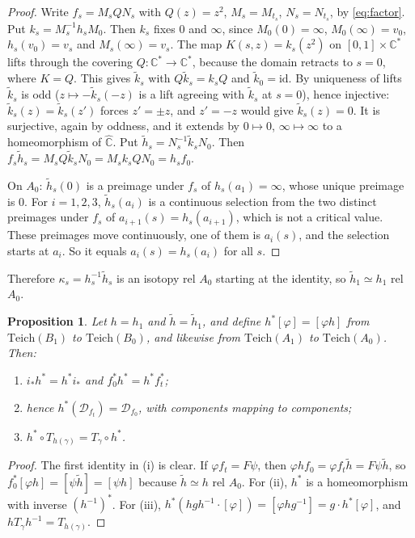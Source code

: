 \documentclass[11pt]{article}
\newtheorem{proposition}{Proposition}[section]
\theoremstyle{definition}
\newcommand{\Teich}{\mathrm{Teich}}
\newcommand{\Ch}{\hat{\mathbb C}}
\newcommand{\D}{\mathcal D}
\begin{document}
\begin{proof}
Write $f_s=M_sQN_s$ with $Q(z)=z^2$, $M_s=M_{t_s}$, $N_s=N_{t_s}$, by \eqref{eq:factor}. Put $k_s=M_s^{-1}h_sM_0$. Then $k_s$ fixes $0$ and $\infty$, since $M_0(0)=\infty$, $M_0(\infty)=v_0$, $h_s(v_0)=v_s$ and $M_s(\infty)=v_s$. The map $K(s,z)=k_s(z^2)$ on $[0,1]\times\mathbb C^*$ lifts through the covering $Q\colon\mathbb C^*\to\mathbb C^*$, because the domain retracts to $s=0$, where $K=Q$. This gives $\tilde k_s$ with $Q\tilde k_s=k_sQ$ and $\tilde k_0=\mathrm{id}$. By uniqueness of lifts $\tilde k_s$ is odd ($z\mapsto-\tilde k_s(-z)$ is a lift agreeing with $\tilde k_s$ at $s=0$), hence injective: $\tilde k_s(z)=\tilde k_s(z')$ forces $z'=\pm z$, and $z'=-z$ would give $\tilde k_s(z)=0$. It is surjective, again by oddness, and it extends by $0\mapsto0$, $\infty\mapsto\infty$ to a homeomorphism of $\Ch$. Put $\tilde h_s=N_s^{-1}\tilde k_sN_0$. Then $f_s\tilde h_s=M_sQ\tilde k_sN_0=M_sk_sQN_0=h_sf_0$.

On $A_0$: $\tilde h_s(0)$ is a preimage under $f_s$ of $h_s(a_1)=\infty$, whose unique preimage is $0$. For $i=1,2,3$, $\tilde h_s(a_i)$ is a continuous selection from the two distinct preimages under $f_s$ of $a_{i+1}(s)=h_s(a_{i+1})$, which is not a critical value. These preimages move continuously, one of them is $a_i(s)$, and the selection starts at $a_i$. So it equals $a_i(s)=h_s(a_i)$ for all $s$.
\end{proof}
Therefore $\kappa_s=h_s^{-1}\tilde h_s$ is an isotopy rel $A_0$ starting at the identity, so $\tilde h_1\simeq h_1$ rel $A_0$.

\begin{proposition}\label{prop:transport}
Let $h=h_1$ and $\tilde h=\tilde h_1$, and define $h^*[\varphi]=[\varphi h]$ from $\Teich(B_1)$ to $\Teich(B_0)$, and likewise from $\Teich(A_1)$ to $\Teich(A_0)$. Then:
\begin{enumerate}[label=\textup{(\roman*)},nosep]
\item $i_*h^*=h^*i_*$ and $f_0^*h^*=h^*f_t^*$;
\item hence $h^*(\D_{f_t})=\D_{f_0}$, with components mapping to components;
\item $h^*\circ T_{h(\gamma)}=T_\gamma\circ h^*$.
\end{enumerate}
\end{proposition}

\begin{proof}
The first identity in (i) is clear. If $\varphi f_t=F\psi$, then $\varphi hf_0=\varphi f_t\tilde h=F\psi\tilde h$, so $f_0^*[\varphi h]=[\psi\tilde h]=[\psi h]$ because $\tilde h\simeq h$ rel $A_0$. For (ii), $h^*$ is a homeomorphism with inverse $(h^{-1})^*$. For (iii), $h^*(hgh^{-1}\cdot[\varphi])=[\varphi hg^{-1}]=g\cdot h^*[\varphi]$, and $hT_\gamma h^{-1}=T_{h(\gamma)}$.
\end{proof}
\end{document}
